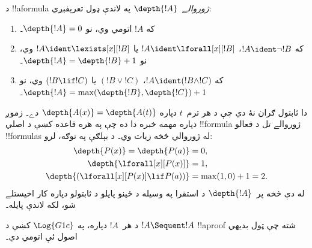 \documentclass[../../../include/open-logic-section]{subfiles}
\begin{document}
\begin{defn}
د !!a{formula} \emph{ژوروالے}~$\depth{!A}$ په لاندې ډول تعريفېږي:
\begin{enumerate}
  \item که $!A$ اتومي وي، نو $\depth{!A} = 0$۔
  \item که $!A \ident \lnot !B$، $!A \ident \lforall[x][!B]$ يا $!A \ident \lexists[x][!B]$ وي، نو $\depth{!A} = \depth{!B} + 1$۔
  \item که $!A \ident (!B \land !C)$، $(!B \lor !C)$ يا $(!B \lif
  !C)$ وي، نو $\depth{!A} = \max(\depth{!B},\depth{!C}) + 1$۔
\end{enumerate}
\end{defn}

دا ثابتول ګران نۀ دي چې د هر ترم~$t$ دپاره $\depth{A(x)} = \depth{A(t)}$ دے۔ زموږ دپاره مهمه خبره دا ده چې په هره قاعده کښې د اصلي !!{formula} ژوروالے تل د فعالو !!{formula}s له ژوروالي څخه زيات وي۔ د بېلګې په توګه، لرو:
\begin{align*}
\depth{P(x)} = \depth{P(a)} & = 0,\\
\depth{\lforall[x][P(x)]} & = 1,\\
\depth{(\lforall[x][P(x)] \lif P(a))} & = \max(1,0) + 1 = 2.
\end{align*}
له دې څخه پر~$\depth{!A}$ د استقرا په وسيله د ځينو پايلو د ثابتولو دپاره کار اخيستلے شو، لکه لاندې پايله۔

\begin{prop}
د هر~$!A$ دپاره، په $\Log{G1c}$ کښې د $!A \Sequent !A$ !!a{proof} شته چې ټول بديهي اصول ئې اتومي دي۔
\end{prop}
\end{document}
